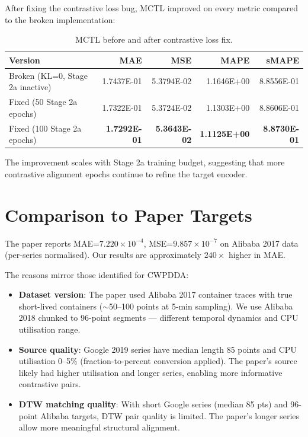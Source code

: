 \documentclass[12pt,a4paper]{article}
\begin{document}
After fixing the contrastive loss bug, MCTL improved on every metric compared
to the broken implementation:

\begin{table}[H]
\centering
\caption{MCTL before and after contrastive loss fix.}
\label{tab:improvement}
\begin{tabular}{@{}lrrrr@{}}
\toprule
\textbf{Version} & \textbf{MAE} & \textbf{MSE} & \textbf{MAPE} & \textbf{sMAPE} \\
\midrule
Broken (KL=0, Stage 2a inactive) & 1.7437E-01 & 5.3794E-02 & 1.1646E+00 & 8.8556E-01 \\
Fixed (50 Stage 2a epochs)        & 1.7322E-01 & 5.3724E-02 & 1.1303E+00 & 8.8606E-01 \\
Fixed (100 Stage 2a epochs)       & \textbf{1.7292E-01} & \textbf{5.3643E-02} & \textbf{1.1125E+00} & \textbf{8.8730E-01} \\
\bottomrule
\end{tabular}
\end{table}

The improvement scales with Stage 2a training budget, suggesting that more
contrastive alignment epochs continue to refine the target encoder.

\section{Comparison to Paper Targets}

The paper reports MAE=$7.220 \times 10^{-4}$, MSE=$9.857 \times 10^{-7}$
on Alibaba 2017 data (per-series normalised).
Our results are approximately $240\times$ higher in MAE.

The reasons mirror those identified for CWPDDA:

\begin{itemize}
    \item \textbf{Dataset version}: The paper used Alibaba 2017 container traces
    with true short-lived containers ($\sim$50--100 points at 5-min sampling).
    We use Alibaba 2018 chunked to 96-point segments — different temporal
    dynamics and CPU utilisation range.

    \item \textbf{Source quality}: Google 2019 series have median length 85 points
    and CPU utilisation 0--5\% (fraction-to-percent conversion applied).  The
    paper's source likely had higher utilisation and longer series, enabling
    more informative contrastive pairs.

    \item \textbf{DTW matching quality}: With short Google series (median 85 pts)
    and 96-point Alibaba targets, DTW pair quality is limited.  The paper's
    longer series allow more meaningful structural alignment.
\end{itemize}
\end{document}
